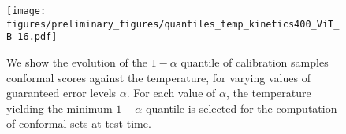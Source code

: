 \begin{figure}[t]
    \centering
    \texttt{[image: figures/preliminary\_figures/quantiles\_temp\_kinetics400\_ViT\_B\_16.pdf]}
    \caption{We show the evolution of the $1-\alpha$ quantile of calibration samples conformal scores against the temperature, for varying values of guaranteed error levels $\alpha$. For each value of $\alpha$, the temperature yielding the minimum $1-\alpha$ quantile is selected for the computation of conformal sets at test time.  }
    \label{fig:temp_selection}
\end{figure}